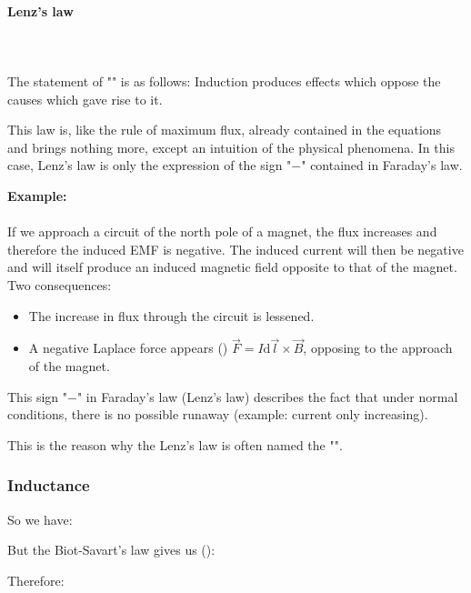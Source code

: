 	\paragraph{Lenz's law}\mbox{}\\\\
	The statement of "\label{Lenz's law}" is as follows: Induction produces effects which oppose the causes which gave rise to it.

	This law is, like the rule of maximum flux, already contained in the equations and brings nothing more, except an intuition of the physical phenomena. In this case, Lenz's law is only the expression of the sign "$-$" contained in Faraday's law.
	
	\begin{tcolorbox}[colframe=black,colback=white,sharp corners]
	\textbf{{\Large {}}Example:}\\\\
	If we approach a circuit of the north pole of a magnet, the flux increases and therefore the induced EMF is negative. The induced current will then be negative and will itself produce an induced magnetic field opposite to that of the magnet. Two consequences:
	\begin{itemize}
		\item The increase in flux through the circuit is lessened.
		
		\item A negative Laplace force appears () $\vec{F}=I\mathrm{d}\vec{l}\times\vec{B}$, opposing to the approach of the magnet.
	\end{itemize}
	\end{tcolorbox}
	This sign "$-$" in Faraday's law (Lenz's law) describes the fact that under normal conditions, there is no possible runaway (example: current only increasing).
	
	This is the reason why the Lenz's law is often named the "".
	
	\subsubsection{Inductance}
	So we have:
	
	But the Biot-Savart's law gives us ():
	
	Therefore:
	
